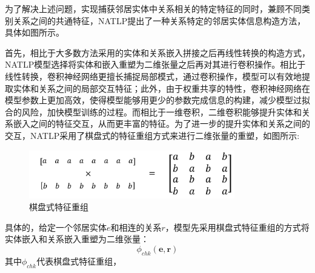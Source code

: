 为了解决上述问题，实现捕获邻居实体中关系相关的特定特征的同时，兼顾不同类别关系之间的共通特征，NATLP提出了一种关系特定的邻居实体信息构造方法，具体如图所示。

首先，相比于大多数方法采用的实体和关系嵌入拼接之后再线性转换的构造方式，NATLP模型选择将实体和嵌入重塑为二维张量之后再对其进行卷积操作。相比于线性转换，卷积神经网络更擅长捕捉局部模式，通过卷积操作，模型可以有效地提取实体和关系之间的局部交互特征；此外，由于权重共享的特性，卷积神经网络在模型参数上更加高效，使得模型能够用更少的参数完成信息的构建，减少模型过拟合的风险，加快模型训练的过程。而相比于一维卷积，二维卷积能够提升实体和关系嵌入之间的特征交互，从而更丰富的特征。为了进一步的提升实体和关系之间的交互，NATLP采用了棋盘式的特征重组方式来进行二维张量的重塑，如图所示:

\begin{figure}[htb]
  \centerline{\includegraphics[width=0.8\textwidth]{pic/cross_conv.pdf}}
  \caption{棋盘式特征重组}
  \label{cross_conv}
\end{figure}

具体的，给定一个邻居实体$e$和相连的关系$r$，模型先采用棋盘式特征重组的方式将实体嵌入和关系嵌入重塑为二维张量：
\begin{equation}
  \phi_{chk}\left(\boldsymbol{e},\boldsymbol{r}\right) 
\end{equation}
其中$\phi_{chk}$代表棋盘式特征重组，

